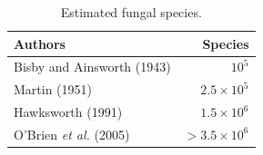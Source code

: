 \documentclass[twoside,12pt,english]{book}
\begin{document}
	\begin{table}
		\vspace{-.5cm}
		\centering
		\footnotesize
		\setlength{\tabcolsep}{4pt}%
		\caption{\label{wraptab}Estimated fungal species.}
		\begin{tabular}{lr}                                            \\\toprule
			Authors                      & Species          \\\midrule
			Bisby and Ainsworth (1943)   & $10^5$           \\
			Martin (1951)                & $2.5\times10^5$  \\
			Hawksworth (1991)            & $1.5\times10^6$  \\
			O’Brien \emph{et al.} (2005) & $>3.5\times10^6$ \\  \bottomrule
		\end{tabular}
	\end{table}

	\lipsum[4-6]
	
\end{document}
